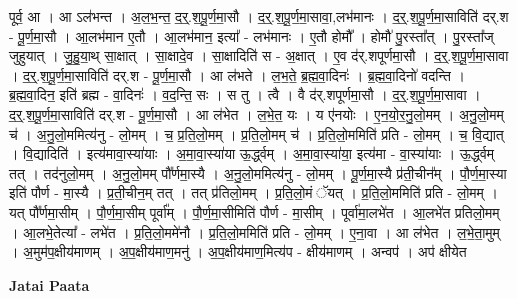 \documentclass[17pt]{extarticle}
\begin{document}
पूर्व॒ आ । आ ऽल॑भन्त । अ॒ल॒भ॒न्त॒ द॒र्॒.श॒पू॒र्ण॒मा॒सौ । द॒र्॒.श॒पू॒र्ण॒मा॒सावा॒,लभ॑मानः । द॒र्॒.श॒पू॒र्ण॒मा॒साविति॑ दर्.श - पू॒र्ण॒मा॒सौ । आ॒लभ॑मान ए॒तौ । आ॒लभ॑मान॒ इत्या᳚ - लभ॑मानः । ए॒तौ होमौ᳚ । होमौ॑ पु॒रस्ता᳚त् । पु॒रस्ता᳚ज् जुहुयात् । जु॒हु॒या॒थ् सा॒क्षात् । सा॒क्षादे॒व । सा॒क्षादिति॑ स - अ॒क्षात् । ए॒व द॑र्.शपूर्णमा॒सौ । द॒र्॒.श॒पू॒र्ण॒मा॒सावा । द॒र्॒.श॒पू॒र्ण॒मा॒साविति॑ दर्.श - पू॒र्ण॒मा॒सौ । आ ल॑भते । ल॒भ॒ते॒ ब्र॒ह्म॒वा॒दिनः॑ । ब्र॒ह्म॒वा॒दिनो॑ वदन्ति । ब्र॒ह्म॒वा॒दिन॒ इति॑ ब्रह्म - वा॒दिनः॑ । व॒द॒न्ति॒ सः । स तु । त्वै । वै द॑र्.शपूर्णमा॒सौ । द॒र्॒.श॒पू॒र्ण॒मा॒सावा । द॒र्॒.श॒पू॒र्ण॒मा॒साविति॑ दर्.श - पू॒र्ण॒मा॒सौ । 
आ ल॑भेत । ल॒भे॒त॒ यः । य ए॑नयोः । ए॒न॒यो॒र॒नु॒लो॒मम् । अ॒नु॒लो॒मम् च॑ । अ॒नु॒लो॒ममित्य॑नु - लो॒मम् । च॒ प्र॒ति॒लो॒मम् । प्र॒ति॒लो॒मम् च॑ । प्र॒ति॒लो॒ममिति॑ प्रति - लो॒मम् । च॒ वि॒द्यात् । वि॒द्यादिति॑ । इत्य॑मावा॒स्या॑याः । अ॒मा॒वा॒स्या॑या ऊ॒र्द्ध्वम् । अ॒मा॒वा॒स्या॑या॒ इत्य॑मा - वा॒स्या॑याः । ऊ॒र्द्ध्वम् तत् । तद॑नुलो॒मम् । अ॒नु॒लो॒मम् पौ᳚र्णमा॒स्यै । अ॒नु॒लो॒ममित्य॑नु - लो॒मम् । पू॒र्ण॒मा॒स्यै प्र॑ती॒चीन᳚म् । पौ॒र्ण॒मा॒स्या इति॑ पौर्ण - मा॒स्यै । प्र॒ती॒चीन॒म् तत् । तत् प्र॑तिलो॒मम् । प्र॒ति॒लो॒मं ॅयत् । प्र॒ति॒लो॒ममिति॑ प्रति - लो॒मम् । यत् पौ᳚र्णमा॒सीम् । पौ॒र्ण॒मा॒सीम् पूर्वा᳚म् । पौ॒र्ण॒मा॒सीमिति॑ पौर्ण - मा॒सीम् । पूर्वा॑मा॒लभे॑त । आ॒लभे॑त प्रतिलो॒मम् । आ॒लभे॒तेत्या᳚ - लभे॑त । प्र॒ति॒लो॒ममे॑नौ । प्र॒ति॒लो॒ममिति॑ प्रति - लो॒मम् । ए॒ना॒वा । आ ल॑भेत । ल॒भे॒ता॒मुम् । अ॒मुम॑प॒क्षीय॑माणम् । अ॒प॒क्षीय॑माण॒मनु॑ । अ॒प॒क्षीय॑माण॒मित्य॑प - क्षीय॑माणम् । अन्वप॑ । अप॑ क्षीयेत \newline

\textbf{Jatai Paata} \newline
\end{document}
